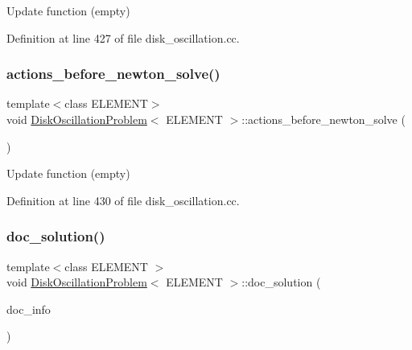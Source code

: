 Update function (empty) 



Definition at line 427 of file disk\+\_\+oscillation.\+cc.

\mbox{\label{classDiskOscillationProblem_afea297af1844657099dec3d717fcccc5}} 
\subsubsection{\texorpdfstring{actions\+\_\+before\+\_\+newton\+\_\+solve()}{actions\_before\_newton\_solve()}}
{\footnotesize\ttfamily template$<$class E\+L\+E\+M\+E\+NT$>$ \\
void \hyperlink{classDiskOscillationProblem}{Disk\+Oscillation\+Problem}$<$ E\+L\+E\+M\+E\+NT $>$\+::actions\+\_\+before\+\_\+newton\+\_\+solve (\begin{DoxyParamCaption}{ }\end{DoxyParamCaption})\hspace{0.3cm}{\ttfamily [inline]}}



Update function (empty) 



Definition at line 430 of file disk\+\_\+oscillation.\+cc.

\mbox{\label{classDiskOscillationProblem_adf6e2bf1843d5f5e3fa7b2fc5fb129a8}} 
\subsubsection{\texorpdfstring{doc\+\_\+solution()}{doc\_solution()}}
{\footnotesize\ttfamily template$<$class E\+L\+E\+M\+E\+NT $>$ \\
void \hyperlink{classDiskOscillationProblem}{Disk\+Oscillation\+Problem}$<$ E\+L\+E\+M\+E\+NT $>$\+::doc\+\_\+solution (\begin{DoxyParamCaption}\item[{Doc\+Info \&}]{doc\+\_\+info }\end{DoxyParamCaption})}



